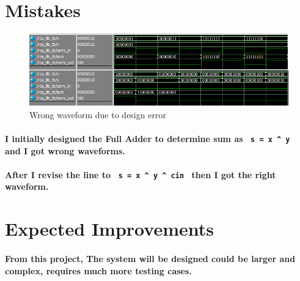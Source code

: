 \documentclass{report}
\begin{document}
        \section{Mistakes}
            \begin{figure}[!htb]
                \centering
                \includegraphics[width=\textwidth]{diagrams/rca-8b-waveform-wrong.png}
                \caption{Wrong waveform due to design error}
            \end{figure}

            \paragraph{\normalfont I initially designed the Full Adder to determine sum as \texttt{ s = x \^{} y } and I got wrong waveforms.}

            \paragraph{\normalfont After I revise the line to \texttt{ s = x \^{} y \^{} cin } then I got the right waveform.}
        \section{Expected Improvements}

            \paragraph{\normalfont From this project, The system will be designed could be larger and complex, requires much more testing cases. }
\end{document}
